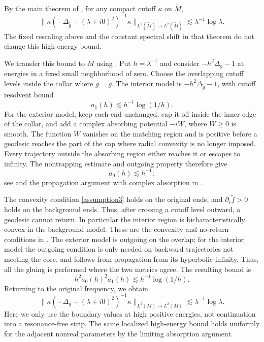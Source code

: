 \documentclass[11pt]{amsart}
\newcommand{\la}{\lambda}
\begin{document}
By the main theorem of \cite{tao2026spectralgapsurfacesinfinite}, for any compact cutoff $\kappa$ on $\tilde M$,
\[
\|\kappa(-\Delta_{\tilde g}-(\la+i0)^2)^{-1}\kappa\|_{L^2(\tilde M)\to L^2(\tilde M)}
\lesssim\la^{-1}\log\la.
\]
The fixed rescaling above and the constant spectral shift in that theorem do not change this high-energy bound.

We transfer this bound to $M$ using \cite[Theorem 2.1]{DVgluing}. Put $h=\la^{-1}$ and consider $-h^2\Delta_g-1$ at energies in a fixed small neighborhood of zero. Choose the overlapping cutoff levels inside the collar where $g=\tilde g$. The interior model is $-h^2\Delta_{\tilde g}-1$, with cutoff resolvent bound
\[
a_1(h)\lesssim h^{-1}\log(1/h).
\]
For the exterior model, keep each end unchanged, cap it off inside the inner edge of the collar, and add a complex absorbing potential $-iW$, where $W\geq0$ is smooth. The function $W$ vanishes on the matching region and is positive before a geodesic reaches the part of the cap where radial convexity is no longer imposed. Every trajectory outside the absorbing region either reaches it or escapes to infinity. The nontrapping estimate and outgoing property therefore give
\[
a_0(h)\lesssim h^{-1};
\]
see \cite{VasyZworski2000} and the propagation argument with complex absorption in \cite[Sections 4 and 5.1]{DVgluing}.

The convexity condition \eqref{assumption3} holds on the original ends, and $\partial_r\tilde f>0$ holds on the background ends. Thus, after crossing a cutoff level outward, a geodesic cannot return. In particular the interior region is bicharacteristically convex in the background model. These are the convexity and no-return conditions in \cite[Section 2]{DVgluing}. The exterior model is outgoing on the overlap; for the interior model the outgoing condition is only needed on backward trajectories not meeting the core, and follows from propagation from its hyperbolic infinity. Thus, all the gluing is performed where the two metrics agree. The resulting bound is
\[
h^2a_0(h)^2a_1(h)\lesssim h^{-1}\log(1/h).
\]
Returning to the original frequency, we obtain
\begin{equation}\label{eq:res-log-M}
\|\kappa(-\Delta_g-(\la+i0)^2)^{-1}\kappa\|_{L^2(M)\to L^2(M)}
\lesssim \la^{-1}\log\la.
\end{equation}
Here we only use the boundary values at high positive energies, not continuation into a resonance-free strip. The same localized high-energy bound holds uniformly for the adjacent nonreal parameters by the limiting absorption argument.
\end{document}
